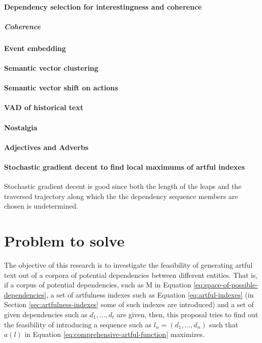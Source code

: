 \documentclass{article}
\begin{document}
		\paragraph{Dependency selection for interestingness and coherence}
		\subparagraph{Coherence} \cite{xu-2018-a-skeleton-based-model-for-promoting-coherence-among-sentences-in-narrative-story-generation} 
		\paragraph{Event embedding}
		\citet{modi-2014-learning-semantic-script-knowledge-with-event-embeddings,modi-2016-event-embeddings-for-semantic-script-modeling}
		\paragraph{Semantic vector clustering}
		\paragraph{Semantic vector shift on actions}
		\paragraph{VAD of historical text}
		\citet{buechel-2016-feelings-from-the-past-adapting-affective-lexicons-for-historical-emotion-analysis}
		\paragraph{Nostalgia}
		\paragraph{Adjectives and Adverbs}
		\paragraph{Stochastic gradient decent to find local maximums of artful indexes} Stochastic gradient decent is good since both the length of the leaps and the traversed trajectory along which the the dependency sequence members are chosen is undetermined.   
	
	\section{Problem to solve} \label{sec:objective}
	The objective of this research is to investigate the feasibility of generating artful text out of a corpora of potential dependencies between different entities. That is, if a corpus of potential dependencies, such as M in Equation \ref{eq:space-of-possible-dependencies}, a set of artfulness indexes such as Equation \ref{eq:artful-indexes} (in Section \ref{sec:artfulness-indexes} some of such indexes are introduced) and a set of given dependencies such as $d_1,...,d_t$ are given, then, this proposal tries to find out the feasibility of introducing a sequence such as $l_n=(d_1,...,d_{n})$ such that $a(l)$ in Equation \ref{eq:comprehensive-artful-function} maximizes.
\end{document}
